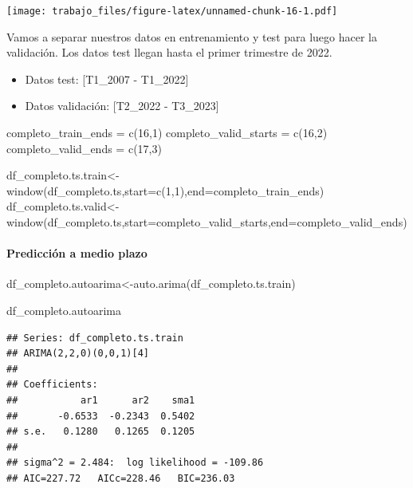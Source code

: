 \documentclass[
]{article}
\newenvironment{Shaded}{\begin{snugshade}}{\end{snugshade}}
\newcommand{\AttributeTok}[1]{\textcolor[rgb]{0.77,0.63,0.00}{#1}}
\newcommand{\DecValTok}[1]{\textcolor[rgb]{0.00,0.00,0.81}{#1}}
\newcommand{\FunctionTok}[1]{\textcolor[rgb]{0.00,0.00,0.00}{#1}}
\newcommand{\NormalTok}[1]{#1}
\newcommand{\OtherTok}[1]{\textcolor[rgb]{0.56,0.35,0.01}{#1}}
\begin{document}
\texttt{[image: trabajo\_files/figure-latex/unnamed-chunk-16-1.pdf]}

Vamos a separar nuestros datos en entrenamiento y test para luego hacer
la validación. Los datos test llegan hasta el primer trimestre de 2022.

\begin{itemize}
\item
  Datos test: {[}T1\_2007 - T1\_2022{]}
\item
  Datos validación: {[}T2\_2022 - T3\_2023{]}
\end{itemize}

\begin{Shaded}
\begin{Highlighting}[]
\NormalTok{completo\_train\_ends }\OtherTok{=} \FunctionTok{c}\NormalTok{(}\DecValTok{16}\NormalTok{,}\DecValTok{1}\NormalTok{)}
\NormalTok{completo\_valid\_starts }\OtherTok{=} \FunctionTok{c}\NormalTok{(}\DecValTok{16}\NormalTok{,}\DecValTok{2}\NormalTok{)}
\NormalTok{completo\_valid\_ends }\OtherTok{=} \FunctionTok{c}\NormalTok{(}\DecValTok{17}\NormalTok{,}\DecValTok{3}\NormalTok{)}

\NormalTok{df\_completo.ts.train}\OtherTok{\textless{}{-}}\FunctionTok{window}\NormalTok{(df\_completo.ts,}\AttributeTok{start=}\FunctionTok{c}\NormalTok{(}\DecValTok{1}\NormalTok{,}\DecValTok{1}\NormalTok{),}\AttributeTok{end=}\NormalTok{completo\_train\_ends)}
\NormalTok{df\_completo.ts.valid}\OtherTok{\textless{}{-}}\FunctionTok{window}\NormalTok{(df\_completo.ts,}\AttributeTok{start=}\NormalTok{completo\_valid\_starts,}\AttributeTok{end=}\NormalTok{completo\_valid\_ends)}
\end{Highlighting}
\end{Shaded}

\hypertarget{predicciuxf3n-a-medio-plazo}{%
\paragraph{Predicción a medio plazo}\label{predicciuxf3n-a-medio-plazo}}

\begin{Shaded}
\begin{Highlighting}[]
\NormalTok{df\_completo.autoarima}\OtherTok{\textless{}{-}}\FunctionTok{auto.arima}\NormalTok{(df\_completo.ts.train)}

\NormalTok{df\_completo.autoarima}
\end{Highlighting}
\end{Shaded}

\begin{verbatim}
## Series: df_completo.ts.train 
## ARIMA(2,2,0)(0,0,1)[4] 
## 
## Coefficients:
##           ar1      ar2    sma1
##       -0.6533  -0.2343  0.5402
## s.e.   0.1280   0.1265  0.1205
## 
## sigma^2 = 2.484:  log likelihood = -109.86
## AIC=227.72   AICc=228.46   BIC=236.03
\end{verbatim}
\end{document}
